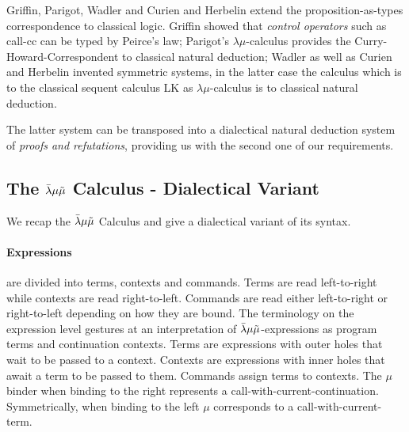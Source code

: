 \documentclass{IOS-Book-Article}
\begin{document}
  Griffin, Parigot, Wadler \cite{Griffin1990-FormulaeAsTypesOfControl, Parigot1992-LambdaMu, Wadler2003-CBVIsDualToCBN} and Curien and Herbelin \cite{CurienHerbelin2000-DualityOfComputation} extend the proposition-as-types correspondence to classical logic. Griffin showed that \emph{control operators} such as call-cc can be typed by Peirce's law; Parigot's $\lambda\mu$-calculus provides the Curry-Howard-Correspondent to classical natural deduction; Wadler as well as Curien and Herbelin invented symmetric systems, in the latter case the \matilda calculus which is to the classical sequent calculus LK as $\lambda\mu$-calculus is to classical natural deduction.

  The latter system can be transposed into a dialectical natural deduction system \cite{Herbelin2005CestMaintenant, LovasCrary2006StructuralNormalization, Harper2016PFPL} of \emph{proofs and refutations}, providing us with the second one of our requirements.

\subsection{The $\bar{\lambda}\mu\tilde{\mu}$ Calculus - Dialectical Variant}\label{sec:matilda-calc-dial}

We recap the $\bar{\lambda}\mu\tilde{\mu}$ Calculus and give a dialectical variant of its syntax.
\paragraph{Expressions} are divided into terms, contexts and commands.
Terms are read left-to-right while contexts are read right-to-left.
Commands are read either left-to-right or right-to-left depending on how they are bound.
The terminology on the expression level gestures at an interpretation of $\bar{\lambda}\mu\tilde{\mu}$-expressions as program terms and continuation contexts.
Terms are expressions with outer holes that wait to be passed to a context.
Contexts are expressions with inner holes that await a term to be passed to them.
Commands assign terms to contexts.
The $\mu$ binder when binding to the right represents a call-with-current-continuation.
Symmetrically, when binding to the left $\mu$ corresponds to a call-with-current-term.

  \begin{grammar}



  \end{grammar}
\end{document}
